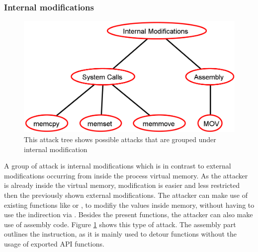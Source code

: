 \subsubsection{Internal modifications}
\label{sec:internal_modifications}
\begin{figure}[h]
\centering
\includegraphics[scale=0.45]{sections/adtrees/InternalModificationsWithoutDefenses.png}
\caption{This attack tree shows possible attacks that are grouped under internal modification}
\label{fig:attacks_internal}
\end{figure}
A group of attack is internal modifications which is in contrast to external modifications occurring from inside the process virtual memory. As the attacker is already inside the virtual memory, modification is easier and less restricted then the previously shown external modifications. The attacker can make use of existing functions like  or , to modifiy the values inside memory, without having to use the indirection via . Besides the present  functions, the attacker can also make use of assembly code. Figure \ref{fig:attacks_internal} shows this type of attack. The assembly part outlines the  instruction, as it is mainly used to detour functions without the usage of exported API functions.